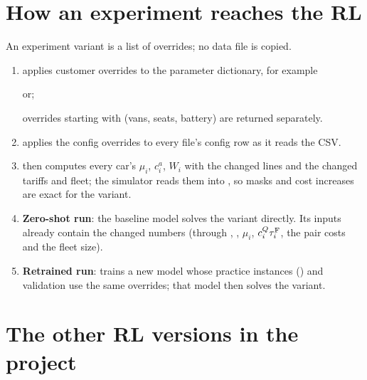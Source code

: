 \section{How an experiment reaches the RL}

An experiment variant is a list of  overrides; no data file is copied.
\begin{enumerate}
  \item {} applies customer overrides to the parameter dictionary, for example
\begin{center}\quad or\quad {};\end{center} overrides starting with  (vans, seats, battery) are returned separately.
  \item {} applies the config overrides to every file's config row as it reads the CSV.
  \item {} then computes every car's $\mu_i$, $c^a_i$, $W_i$ with the changed lines and the changed tariffs and fleet; the simulator reads them into , so masks and cost increases are exact for the variant.
  \item \textbf{Zero-shot run}: the baseline model solves the variant directly. Its inputs already contain the changed numbers (through , , $\mu_i$, $c^Q_i\tau^{\mathrm{F}}_i$, the pair costs and the fleet size).
  \item \textbf{Retrained run}:  trains a new model whose practice instances () and validation use the same overrides; that model then solves the variant.
\end{enumerate}

\section{The other RL versions in the project}
\label{sec:versions}

